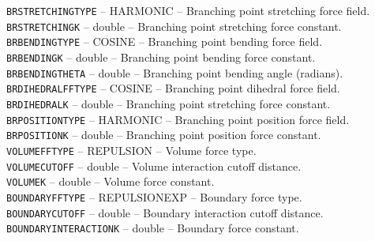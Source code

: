 \documentclass[11pt, oneside]{article}   	%
\begin{document}
     \noindent \texttt{BRSTRETCHINGTYPE} -- HARMONIC -- Branching point stretching force field. \\
   
     \noindent \texttt{BRSTRETCHINGK} -- double -- Branching point stretching force constant. \\
   
    \noindent  \texttt{BRBENDINGTYPE} -- COSINE -- Branching point bending force field. \\
   
    \noindent \texttt{BRBENDINGK} -- double -- Branching point bending force constant. \\
    
    \noindent \texttt{BRBENDINGTHETA} -- double -- Branching point bending angle (radians). \\
   
    \noindent \texttt{BRDIHEDRALFFTYPE} -- COSINE -- Branching point dihedral force field.
    \\
   
     \noindent \texttt{BRDIHEDRALK} -- double -- Branching point stretching force constant. \\
   
     \noindent \texttt{BRPOSITIONTYPE} -- HARMONIC -- Branching point position force field.\\
   
     \noindent \texttt{BRPOSITIONK} -- double -- Branching point position force constant. \\
   
     \noindent \texttt{VOLUMEFFTYPE} -- REPULSION -- Volume force type. \\
   
    \noindent  \texttt{VOLUMECUTOFF} -- double -- Volume interaction cutoff distance.\\
   
    \noindent  \texttt{VOLUMEK} -- double -- Volume force constant. \\
   
     \noindent \texttt{BOUNDARYFFTYPE} -- REPULSIONEXP -- Boundary force type. \\
   
      \noindent \texttt{BOUNDARYCUTOFF} -- double -- Boundary interaction cutoff distance.\\
   
     \noindent \texttt{BOUNDARYINTERACTIONK} -- double -- Boundary force constant. \\
   
\end{document}
